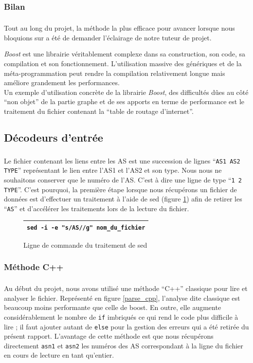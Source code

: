 \subsubsection{Bilan}
\subparagraph{}
Tout au long du projet, la méthode la plus efficace pour avancer lorsque nous bloquions sur \boost a été de demander l'éclairage de notre tuteur de projet. 

\textit{Boost} est une librairie véritablement complexe dans sa construction, son code, sa compilation et son fonctionnement. L'utilisation massive des génériques et de la méta-programmation peut rendre la compilation relativement longue mais améliore grandement les performances.
~\\
Un exemple d'utilisation  concrète de la librairie \textit{Boost}, des difficultés dûes au côté ``non objet'' de la partie graphe et de ses apports en terme de performance est le traitement du fichier contenant la ``table de routage d'internet''.

\subsection{Décodeurs d'entrée}
\subparagraph{}
Le fichier contenant les liens entre les AS est une succession de lignes ``\verb|AS1 AS2 TYPE|'' représentant le lien entre l'AS1 et l'AS2 et son type. Nous nous ne souhaitons conserver que le numéro de l'AS. C'est à dire une ligne de type ``\verb|1 2 TYPE|''. C'est pourquoi, la première étape lorsque nous récupérons un fichier de données est d'effectuer un traitement à l'aide de sed (figure \ref{sed}) afin de retirer les ``\verb|AS|'' et d'accélérer les traitements lors de la lecture du fichier. 
\begin{figure}[H]
   \begin{center}
      \begin{tabular}{l}
         \hline
         \verb|sed -i -e "s/AS//g" nom_du_fichier|\\
         \hline
      \end{tabular}
   \end{center}
\caption{\label{sed} Ligne de commande du traitement de sed}
\end{figure}

\subsubsection{Méthode C++}
\subparagraph{}
Au début du projet, nous avons utilisé une méthode ``C++'' classique pour lire et analyser le fichier. 
Représenté en figure \ref{parse_cpp}, l'analyse dite classique est beaucoup moins performante que celle de boost. En outre, elle augmente considérablement le nombre de \verb|if| imbriqués ce qui rend le code plus difficile à lire ; il faut ajouter autant de \verb|else| pour la gestion des erreurs qui a été retirée du présent rapport. L'avantage de cette méthode est que nous récupérons directement \verb|asn1| et \verb|asn2| les numéros des AS correspondant à la ligne du fichier en cours de lecture en tant qu'entier.

